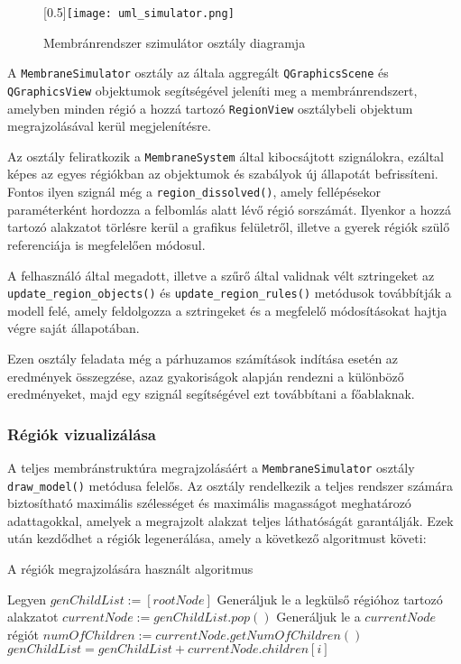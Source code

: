 \begin{figure}[H]
\centering
	\scalebox{0.5}[0.5]{\texttt{[image: uml\_simulator.png]}}
	\caption{Membránrendszer szimulátor osztály diagramja}
	\label{fig:uml_simulator}
\end{figure}

A \verb|MembraneSimulator| osztály az általa aggregált \verb|QGraphicsScene| és \verb|QGraphicsView| objektumok segítségével jeleníti meg a membránrendszert, amelyben minden régió a hozzá tartozó \verb|RegionView| osztálybeli objektum megrajzolásával kerül megjelenítésre. 

Az osztály feliratkozik a \verb|MembraneSystem| által kibocsájtott szignálokra, ezáltal képes az egyes régiókban az objektumok és szabályok új állapotát befrissíteni. Fontos ilyen szignál még a \verb|region_dissolved()|, amely fellépésekor paraméterként hordozza a felbomlás alatt lévő régió sorszámát. Ilyenkor a hozzá tartozó alakzatot törlésre kerül a  grafikus felületről, illetve a gyerek régiók szülő referenciája is megfelelően módosul. 

A felhasználó által megadott, illetve a szűrő által validnak vélt sztringeket az \verb|update_region_objects()| és \verb|update_region_rules()| metódusok továbbítják a modell felé, amely feldolgozza a sztringeket és a megfelelő módosításokat hajtja végre saját állapotában.

Ezen osztály feladata még a párhuzamos számítások indítása esetén az eredmények összegzése, azaz gyakoriságok alapján rendezni a különböző eredményeket, majd egy szignál segítségével ezt továbbítani a főablaknak.

\subsubsection{Régiók vizualizálása}

A teljes membránstruktúra megrajzolásáért a \verb|MembraneSimulator| osztály \verb|draw_model()| metódusa felelős. Az osztály rendelkezik a teljes rendszer számára biztosítható maximális szélességet és maximális magasságot meghatározó adattagokkal, amelyek a megrajzolt alakzat teljes láthatóságát garantálják. Ezek után kezdődhet a régiók legenerálása, amely a következő algoritmust követi:

\begin{algorithm}[H]
\caption{A régiók megrajzolására használt algoritmus}
\label{alg:draw_model}
\begin{algorithmic}[1] %
\State Legyen $genChildList := [rootNode]$
\State Generáljuk le a legkülső régióhoz tartozó alakzatot
	\State $currentNode := genChildList.pop()$
	\State Generáljuk le a $currentNode$ régiót
	\State $numOfChildren := currentNode.getNumOfChildren()$
		\State $genChildList = genChildList + currentNode.children[i]$
		\EndFor
	\EndIf
\EndWhile
\end{algorithmic}
\end{algorithm}

